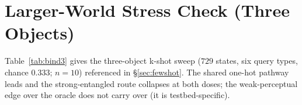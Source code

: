 \documentclass[10pt]{article} %
\begin{document}
\begin{table}[h]
\centering\small
{}
\caption{One-page experimental specification (binding holdout, $n{=}20$). ``Trained-type'' is
accuracy on the three query types seen in training (memorized, ${\approx}1.0$; strong-entangled
${\approx}0.9$, still fitting); ``All-space'' is balanced accuracy over all four types
(${=}\,\tfrac14(3{\cdot}\text{trained}+\text{held-out})$); ``Held-out'' is converged balanced
accuracy on the never-trained query type (chance $0.25$).
Per-seed values, all splits, and the full route/split/probe details are in the released manifests
and code.}
\label{tab:spec}
\end{table}

\section{Larger-World Stress Check (Three Objects)}
\label{app:bind3}
Table~\ref{tab:bind3} gives the three-object k-shot sweep ($729$ states, six query types, chance
$0.333$; $n{=}10$) referenced in \S\ref{sec:fewshot}. The shared one-hot pathway leads and the
strong-entangled route collapses at both doses; the weak-perceptual edge over the oracle does not
carry over (it is testbed-specific).
\end{document}
